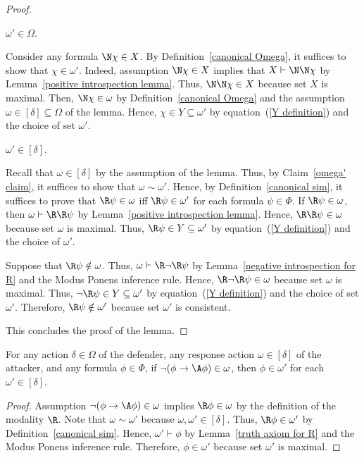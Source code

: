 \documentclass[letterpaper]{article}
\begin{document}
\begin{proof}
\begin{claim}\label{omega' claim}
$\omega'\in \Omega$.
\end{claim}
\begin{proof-of-claim}
Consider any formula $\N\chi\in X$. By Definition~\ref{canonical Omega}, it suffices to show that $\chi\in\omega'$. Indeed, assumption  $\N\chi\in X$ implies that $X\vdash\N\N\chi$ by Lemma~\ref{positive introspection lemma}. Thus, $\N\N\chi\in X$ because set $X$ is maximal. Then, $\N\chi\in\omega$ by Definition~\ref{canonical Omega} and the assumption $\omega\in[\delta]\subseteq\Omega$ of the lemma. Hence, $\chi\in Y\subseteq \omega'$ by equation~(\ref{Y definition}) and the choice of set $\omega'$.
\end{proof-of-claim}

\begin{claim}
$\omega'\in[\delta]$.
\end{claim}
\begin{proof-of-claim}
Recall that $\omega\in[\delta]$ by the assumption of the lemma. Thus, by Claim~\ref{omega' claim}, it suffices to show that $\omega\sim\omega'$. 
Hence, by Definition~\ref{canonical sim}, it suffices to prove that $\R\psi\in \omega$ iff $\R\psi\in \omega'$ for each formula $\psi\in\Phi$. If $\R\psi\in \omega$, then $\omega\vdash\R\R\psi$ by Lemma~\ref{positive introspection lemma}. Hence, $\R\R\psi\in\omega$ because set $\omega$ is maximal.  Thus, $\R\psi\in Y\subseteq \omega'$ by equation~(\ref{Y definition}) and the choice of $\omega'$.

Suppose that $\R\psi\notin \omega$. Thus, $\omega\vdash \R\neg\R\psi$ by Lemma~\ref{negative introspection for R} and the Modus Ponens inference rule. Hence, $\R\neg\R\psi\in \omega$ because set $\omega$ is maximal.  Thus, $\neg\R\psi\in Y\subseteq \omega'$ by equation~(\ref{Y definition}) and the choice of set $\omega'$. Therefore, $\R\psi\notin \omega'$ because set $\omega'$ is consistent.
\end{proof-of-claim}
This concludes the proof of the lemma.
\end{proof}

\begin{lemma}\label{A child all}
For any action $\delta\in\Omega$ of the defender, any response action $\omega\in [\delta]$ of the attacker, and any formula $\phi\in\Phi$, if $\neg(\phi\to \A\phi)\in \omega$, then $\phi\in \omega'$ for each $\omega'\in[\delta]$.
\end{lemma}
\begin{proof}
Assumption $\neg(\phi\to \A\phi)\in \omega$ implies $\R\phi\in \omega$ by the definition of the modality $\R$. Note that $\omega\sim\omega'$ because $\omega,\omega'\in[\delta]$. Thus, $\R\phi\in \omega'$ by Definition~\ref{canonical sim}. Hence, $\omega'\vdash\phi$ by Lemma~\ref{truth axiom for R} and the Modus Ponens inference rule. Therefore, $\phi\in \omega'$ because set $\omega'$ is maximal.
\end{proof}
\end{document}
